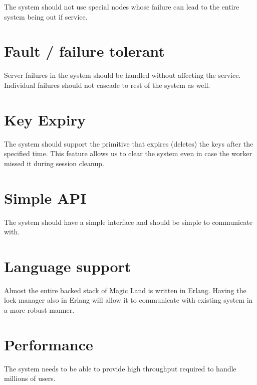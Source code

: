 The system should not use special nodes whose failure can lead to the
entire system being out if service.

\section{Fault / failure tolerant}


Server failures in the system should be handled without affecting the service.
Individual failures should not cascade to rest of the system as well.

\section{Key Expiry}


The system should support the primitive that expires (deletes) the keys after
the specified time. This feature allows us to clear the system even in case
the worker missed it during session cleanup.

\section{Simple API}


The system should have a simple interface and should be simple to communicate
with.

\section{Language support}


Almost the entire backed stack of Magic Land is written in Erlang. Having the
lock manager also in Erlang will allow it to communicate with existing
system in a more robust manner.

\section{Performance}


The system needs to be able to provide high throughput required to handle
millions of users.

